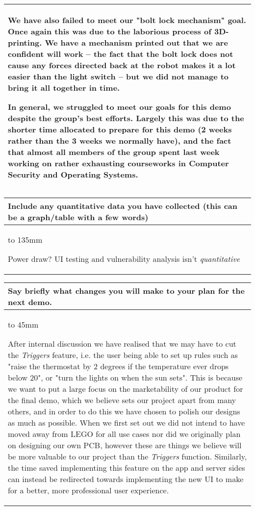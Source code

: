 \documentclass[a4paper]{article}
\newcommand{\colWidth}{141mm}
\begin{document}
\begin{center}
\begin{tabular}{|p{\colWidth}|}
{		\vspace{3mm}
		
		We have also failed to meet our "bolt lock mechanism" goal. Once again this was due to the
		laborious process of 3D-printing. We have a mechanism printed out that we are confident will work
		-- the fact that the bolt lock does not cause any forces directed back at the robot makes it a lot
		easier than the light switch -- but we did not manage to bring it all together in time.
		
		\vspace{3mm}
		
		In general, we struggled to meet our goals for this demo despite the group's best efforts.
		Largely this was due to the shorter time allocated to prepare for this demo (2 weeks rather than the 3 weeks we normally have), and the fact that almost all members of the group spent last week working on rather exhausting
		courseworks in Computer Security and Operating Systems.
		
  }
  \\
  \hline
\end{tabular}
\vskip 5mm


\begin{tabular}{|p{\colWidth}|}
	\hline
	\cellcolor{blue!25}\large
	\textbf{Include any quantitative data you have collected (this can be a graph/table with a few words)}
	\\ \hline
	\vtop to 135mm{
		\color{red} Power draw? UI testing and vulnerability analysis isn't \textit{quantitative}

  }
  \\
  \hline
\end{tabular}
\vskip 5mm


\begin{tabular}{|p{\colWidth}|}
	\hline
	\cellcolor{blue!25}\large
	\textbf{Say briefly what changes you will make to your plan for the next demo.}
	\\ \hline
	\vtop to 45mm{
		After internal discussion we have realised that we may have to cut the \textit{Triggers} feature,
		i.e. the user being able to set up rules such as "raise the thermostat by 2 degrees if the temperature ever drops below 20",
		or "turn the lights on when the sun sets".
		This is because we want to put a large focus on the marketability of our product for the final demo, which we believe sets
		our project apart from many others, and in order to do this we have chosen to polish our designs as much as possible.
		When we first set out we did not intend to have moved away from LEGO for all use cases nor did we originally plan on designing our own PCB, however these are things we believe will be more valuable to our project than the \textit{Triggers} function.
		Similarly, the time saved implementing this feature on the app and server sides can instead be redirected towards implementing the new UI to make for a better, more professional user experience.
		
}
\end{tabular}
\end{center}
\end{document}
